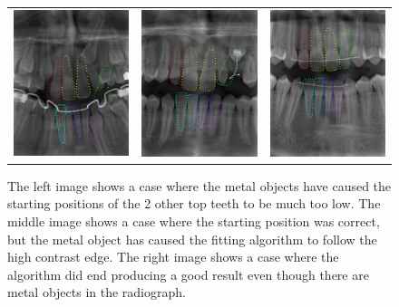 \documentclass[a4paper,10pt]{article}
\begin{document}
\begin{figure}[!h]
\begin{tabular}{ccc}
\includegraphics[width=50mm]{tooth_result_9.png} & \includegraphics[width=50mm]{tooth_result_2.png} & \includegraphics[width=50mm]{tooth_result_10.png} \\
 
\end{tabular}
 \caption{The left image shows a case where the metal objects have caused the starting positions of the 2 other top teeth to be much too low. The middle image shows a case where the starting position was correct, but the metal object has caused the fitting algorithm to follow the high contrast edge. The right image shows a case where the algorithm did end producing a good result even though there are metal objects in the radiograph.}
\end{figure}
\end{document}
